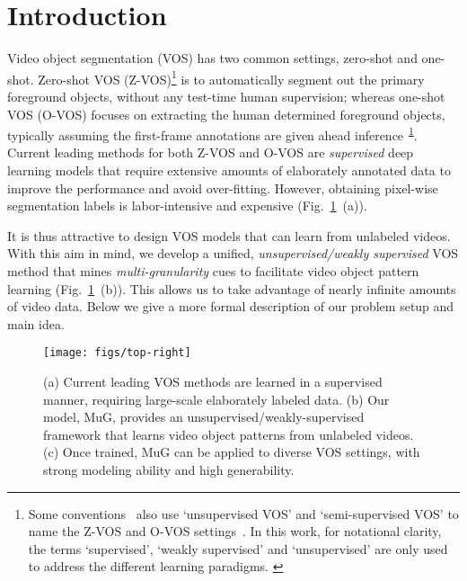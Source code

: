 \documentclass[10pt,twocolumn,letterpaper]{article}
\begin{document}
\section{Introduction}
\vspace{-1pt}
Video object segmentation (VOS) has two common settings, zero-shot and one-shot.
Zero-shot VOS (Z-VOS)\footnote{Some conventions~\!\cite{perazzi2016benchmark,DBLP:conf/cvpr/WangSP15} also use `unsupervised VOS' and `semi-supervised VOS' to name the Z-VOS and O-VOS settings~\!\cite{Caelles_2017_CVPR}. In this work, for notational clarity, the terms `supervised', `weakly supervised' and `unsupervised' are only used to address the different learning paradigms. \label{notation}} is to automatically segment out the primary foreground objects, without any test-time human supervision; whereas one-shot VOS (O-VOS) focuses on extracting the human determined foreground objects, typically assuming the first-frame annotations are given ahead inference\textsuperscript{~\!\ref{notation}}. Current leading methods for both Z-VOS and O-VOS are \textit{supervised} deep learning models that require extensive amounts of elaborately annotated data to improve the performance and avoid over-fitting. However, obtaining pixel-wise segmentation labels is labor-intensive and expensive (Fig.~\!\ref{fig:top-right}~\!(a)).

It is thus attractive to design VOS models that can learn from unlabeled videos. With this aim in mind, we develop a unified, \textit{unsupervised/weakly supervised} VOS method that mines \textit{multi-granularity} cues to facilitate video object pattern learning (Fig.~\!\ref{fig:top-right}~\!(b)). This allows us to take advantage of nearly infinite amounts of video data. Below we give a more
formal description of our problem setup and main idea.

\begin{figure}[t]
\centering
	\texttt{[image: figs/top-right]}
	\vspace{-9pt}
	\captionsetup{font=small}
	\caption{\small{(a) Current leading VOS methods are  learned in a supervised manner,  requiring large-scale elaborately labeled data. (b) Our model, MuG, provides an unsupervised/weakly-supervised framework that learns video object patterns from unlabeled videos. (c) Once trained, MuG can be applied to diverse VOS settings, with strong modeling ability and high generability.
		}
	}
	\label{fig:top-right}
	\vspace{-13pt}
\end{figure}
\end{document}

